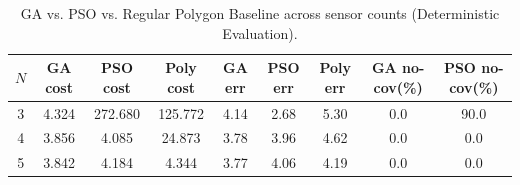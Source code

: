 \begin{table}[t]
\centering
\caption{GA vs. PSO vs. Regular Polygon Baseline across sensor counts (Deterministic Evaluation).}
\label{tab:ga_pso_polygon_all}
\begin{tabular}{ccccccccc}
\hline
$N$ & GA cost & PSO cost & Poly cost & GA err & PSO err & Poly err & GA no-cov(\%) & PSO no-cov(\%) \\
\hline
3 & 4.324 & 272.680 & 125.772 & 4.14 & 2.68 & 5.30 & 0.0 & 90.0 \\
4 & 3.856 & 4.085 & 24.873 & 3.78 & 3.96 & 4.62 & 0.0 & 0.0 \\
5 & 3.842 & 4.184 & 4.344 & 3.77 & 4.06 & 4.19 & 0.0 & 0.0 \\
\hline
\end{tabular}
\end{table}